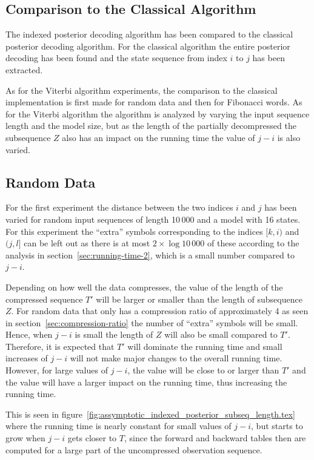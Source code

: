 \subsection{Comparison to the Classical Algorithm}

The indexed posterior decoding algorithm has been compared to the classical
posterior decoding algorithm. For the classical algorithm the entire posterior
decoding has been found and the state sequence from index $i$ to $j$ has
been extracted.

As for the Viterbi algorithm experiments, the comparison to the
classical implementation is first made for random data and then for Fibonacci
words. As for the Viterbi algorithm the algorithm is analyzed by varying the
input sequence length and the model size, but as the length of the partially
decompressed the subsequence $Z$ also has an impact on the running time the
value of $j - i$ is also varied.

\subsection{Random Data}

For the first experiment the distance between the two indices $i$ and $j$ has
been varied for random input sequences of length 10\,000 and a model with 16
states. For this experiment the ``extra'' symbols corresponding to the indices
$[k, i)$ and $(j, l]$ can be left out as there is at most $2 \times \log 10\,000$
of these according to the analysis in section~\ref{sec:running-time-2}, which
is a small number compared to $j - i$.

Depending on how well the data compresses, the value of the length of the
compressed sequence $T'$ will be larger or smaller than the length of
subsequence $Z$. For random data that only has a compression ratio of
approximately 4 as seen in section~\ref{sec:compression-ratio} the number of
``extra'' symbols will be small. Hence, when $j - i$ is small the length of $Z$
will also be small compared to $T'$. Therefore, it is expected that $T'$ will
dominate the running time and small increases of $j - i$ will not make major
changes to the overall running time. However, for large values of $j - i$, the
value will be close to or larger than $T'$ and the value will have a larger
impact on the running time, thus increasing the running time.

This is seen in
figure~\ref{fig:assymptotic_indexed_posterior_subseq_length.tex} where the
running time is nearly constant for small values of $j - i$, but starts to grow
when $j - i$ gets closer to $T$, since the forward and backward tables then are
computed for a large part of the uncompressed observation sequence.

